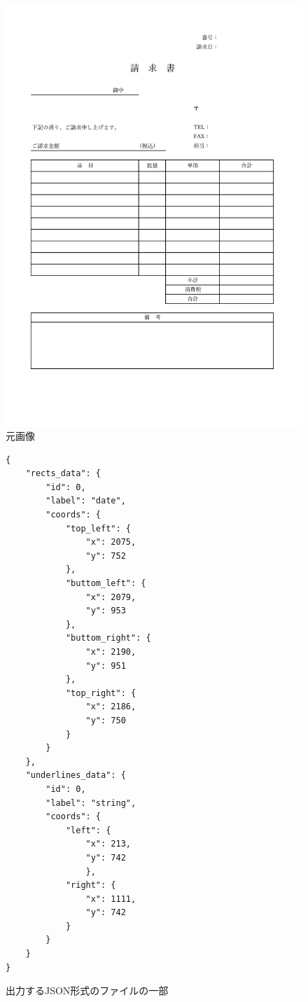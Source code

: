 \begin{figure}[t]
    \begin{center}
        \includegraphics[width=15cm]{image/03-function/original.jpg}
        \caption{元画像}
        \label{fig:original}
    \end{center}
\end{figure}


\lstset{language=}
\begin{figure}[t]
    \begin{lstlisting}
{
    "rects_data": {
        "id": 0, 
        "label": "date",
        "coords": {
            "top_left": {
                "x": 2075,
                "y": 752
            },
            "buttom_left": {
                "x": 2079,
                "y": 953
            },
            "buttom_right": {
                "x": 2190,
                "y": 951
            },
            "top_right": {
                "x": 2186,
                "y": 750
            }
        }
    },
    "underlines_data": {
        "id": 0,
        "label": "string",
        "coords": {
            "left": {
                "x": 213,
                "y": 742
                },
            "right": {
                "x": 1111,
                "y": 742
            }
        }
    }
}
    \end{lstlisting}
    \caption{出力するJSON形式のファイルの一部}\label{fig:example_output_json}
\end{figure}

